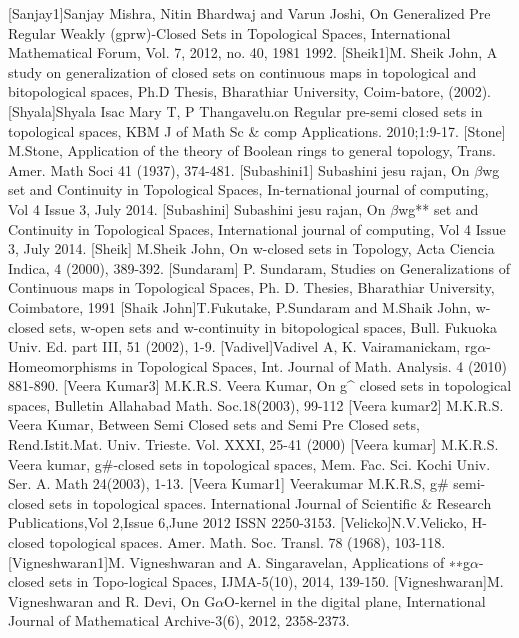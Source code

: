 \begin{thebibliography}{99}
 [Sanjay1]Sanjay Mishra, Nitin Bhardwaj and Varun Joshi, On Generalized Pre Regular Weakly (gprw)-Closed Sets in Topological Spaces, International Mathematical Forum, Vol. 7, 2012, no. 40, 1981 1992.
 [Sheik1]M. Sheik John, A study on generalization of closed sets on continuous maps in topological and bitopological spaces, Ph.D Thesis, Bharathiar University, Coim-batore, (2002).
 [Shyala]Shyala Isac Mary T, P Thangavelu.on Regular pre-semi closed sets in topological spaces, KBM J of Math Sc & comp Applications. 2010;1:9-17.
  [Stone] M.Stone, Application of the theory of Boolean rings to general topology, Trans. Amer. Math Soci  41 (1937), 374-481.
 [Subashini1] Subashini jesu rajan, On $\beta$wg set and Continuity in Topological Spaces, In-ternational journal of computing, Vol 4 Issue 3, July 2014.
 [Subashini] Subashini jesu rajan, On $\beta$wg** set and Continuity in Topological Spaces, International    journal of  computing, Vol 4 Issue 3, July 2014.
 [Sheik] M.Sheik John, On w-closed sets in Topology, Acta Ciencia Indica, 4 (2000), 389-392.
 [Sundaram] P. Sundaram, Studies on Generalizations of Continuous maps in Topological Spaces, Ph. D. Thesies, Bharathiar University, Coimbatore, 1991
 [Shaik John]T.Fukutake, P.Sundaram and M.Shaik John, w-closed sets, w-open sets and w-continuity in bitopological spaces, Bull. Fukuoka Univ. Ed. part III, 51 (2002), 1-9.
 [Vadivel]Vadivel A, K. Vairamanickam, rg$\alpha$-Homeomorphisms in Topological Spaces, Int. Journal of Math. Analysis. 4 (2010) 881-890. 
 [Veera Kumar3]   M.K.R.S. Veera Kumar, On g^ closed sets in topological spaces, Bulletin Allahabad Math. 	Soc.18(2003),  99-112
 [Veera kumar2]  	M.K.R.S. Veera Kumar, Between Semi Closed sets and Semi Pre Closed sets, Rend.Istit.Mat. Univ. Trieste. Vol. XXXI, 25-41 (2000)
 [Veera kumar]  	M.K.R.S. Veera kumar, g#-closed sets in topological spaces, Mem. Fac. Sci. Kochi Univ. Ser. 	A. Math 24(2003), 1-13. 
 [Veera Kumar1]  Veerakumar M.K.R.S, g# semi-closed sets in topological spaces. International Journal of 	Scientific & Research Publications,Vol 2,Issue 6,June 2012 ISSN 2250-3153.
  [Velicko]N.V.Velicko, H-closed topological spaces. Amer. Math. Soc. Transl. 78 (1968), 103-118.
 [Vigneshwaran1]M. Vigneshwaran and A. Singaravelan, Applications of ∗∗g$\alpha$-closed sets in Topo-logical Spaces, IJMA-5(10), 2014, 139-150.
 [Vigneshwaran]M. Vigneshwaran and R. Devi, On G$\alpha$O-kernel in the digital plane, International Journal of Mathematical Archive-3(6), 2012, 2358-2373.

\end{thebibliography}
